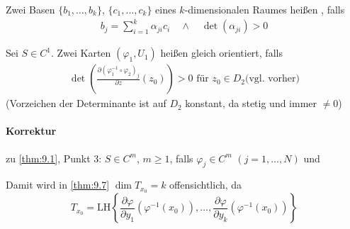 \begin{theorem} \label{thm:9.8}
  \begin{enum-arab}
    \item Zwei Basen $\{b_1,\ldots,b_k\}$, $\{c_1,\ldots,c_k\}$ eines $k$-dimensionalen Raumes heißen , falls
    \begin{align*}
      b_j = \sum\limits_{i=1}^{k} \alpha_{ji} c_i \quad\land\quad \det(\alpha_{ji}) > 0
    \end{align*}
    
    \item Sei $S \in C^1$. Zwei Karten $(\varphi_1,U_1)$ heißen gleich orientiert, falls
    \begin{align*}
      \det \left( \frac{\partial \left( \varphi_1^{-1} \circ \varphi_2 \right)_j}{\partial z}(z_0) \right) > 0 \text{ für } z_0 \in D_2 \text{(vgl. vorher)}
    \end{align*}
    (Vorzeichen der Determinante ist auf $D_2$ konstant, da stetig und immer $\neq 0$)
  \end{enum-arab}
\end{theorem}


\paragraph{Korrektur} zu \ref{thm:9.1}, Punkt 3: $S \in C^m$, $m \geq 1$, falls $\varphi_j \in C^m$ $(j = 1,\ldots,N)$ und 

Damit wird in \ref{thm:9.7} $\dim T_{x_0} = k$ offensichtlich, da \[ T_{x_0} = \mathrm{LH}\left\{ \frac{\partial \varphi}{\partial y_1} \left( \varphi^{-1}(x_0) \right),\ldots,\frac{\partial \varphi}{\partial y_k} \left( \varphi^{-1}(x_0) \right) \right\} \]

